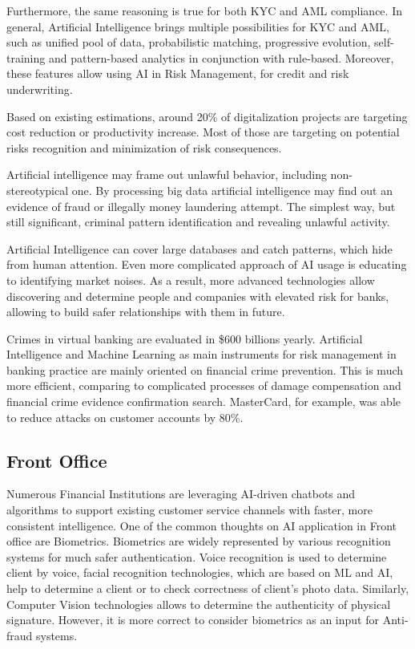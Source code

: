 Furthermore, the same reasoning is true for both KYC and AML compliance.
In general, Artificial Intelligence brings multiple possibilities for KYC and AML, such as unified pool of data, probabilistic matching, progressive evolution, self-training and pattern-based analytics in conjunction with rule-based.
Moreover, these features allow using AI in Risk Management, for credit and risk underwriting.

Based on existing estimations, around 20\% of digitalization projects are targeting cost reduction or productivity increase.
Most of those are targeting on potential risks recognition and minimization of risk consequences.
\cite{ai_reality_hype}

Artificial intelligence may frame out unlawful behavior, including non-stereotypical one.
By processing big data artificial intelligence may find out an evidence of fraud or illegally money laundering attempt.
The simplest way, but still significant, criminal pattern identification and revealing unlawful activity.
 
Artificial Intelligence can cover large databases and catch patterns, which hide from human attention.
Even more complicated approach of AI usage is educating to identifying market noises.
As a result, more advanced technologies allow discovering and determine people and companies with elevated risk for banks, allowing to build safer relationships with them in future.

Crimes in virtual banking are evaluated in \$600 billions yearly.
Artificial Intelligence and Machine Learning as main instruments for risk management in banking practice are mainly oriented on financial crime prevention.
This is much more efficient, comparing to complicated processes of damage compensation and financial crime evidence confirmation search.
MasterCard, for example, was able to reduce attacks on customer accounts by 80\%.
\cite{ways_ai_transforming_bi}
 


\subsection*{Front Office}
\label{subsec:ai_front_office}

Numerous Financial Institutions are leveraging AI-driven chatbots and algorithms to support existing customer service channels with faster, more consistent intelligence.
One of the common thoughts on AI application in Front office are Biometrics.
Biometrics are widely represented by various recognition systems for much safer authentication.
Voice recognition is used to determine client by voice, facial recognition technologies, which are based on ML and AI, help to determine a client or to check correctness of client's photo data.
Similarly, Computer Vision technologies allows to determine the authenticity of physical signature.
However, it is more correct to consider biometrics as an input for Anti-fraud systems. 


